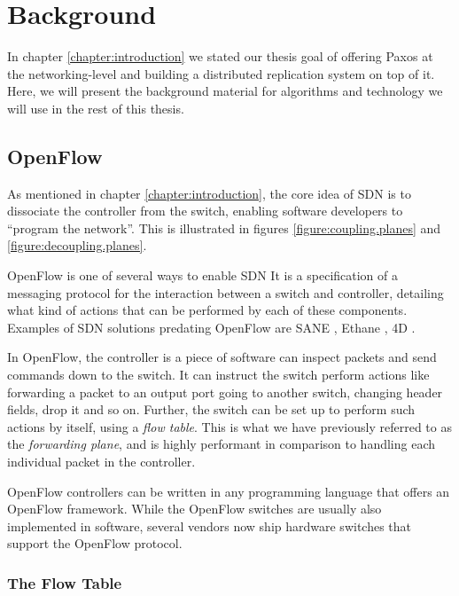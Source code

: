 \chapter{Background}
\label{chapter:background}

In chapter \ref{chapter:introduction} we stated our thesis goal of offering
Paxos at the networking-level and building a distributed replication system
on top of it.
%
Here, we will present the background material for algorithms and technology
we will use in the rest of this thesis.

\section{OpenFlow}
\label{chapter:openflow.background}

As mentioned in chapter \ref{chapter:introduction}, the core idea of
\acs{SDN} is to dissociate the controller from the switch, enabling software
developers to ``program the network''.  This is illustrated in figures
\ref{figure:coupling.planes} and \vref{figure:decoupling.planes}.

OpenFlow \cite{McKeown:2008:OEI:1355734.1355746,openflow-1.0} is one of
several ways to enable \acf{SDN}
%
It is a specification of a messaging protocol for the interaction between
a switch and controller, detailing what kind of actions that can be
performed by each of these components.
%
Examples of \ac{SDN} solutions predating OpenFlow are SANE
\cite{Casado:2006:SPA:1267336.1267346}, Ethane
\cite{Casado:2007:ETC:1282427.1282382}, 4D
\cite{Greenberg:2005:CSA:1096536.1096541}.

In OpenFlow, the controller is a piece of software can inspect packets and
send commands down to the switch.  It can instruct the switch perform actions like
forwarding a packet to an output port going to another switch, changing
header fields, drop it and so on.
%
Further, the switch can be set up to perform such actions by itself,
using a \textit{flow table}.  This is what we have previously referred to as
the \textit{forwarding plane}, and is highly performant in comparison to
handling each individual packet in the controller.

OpenFlow controllers can be written in any programming language that offers
an OpenFlow framework.  While the OpenFlow switches are usually also
implemented in software, several vendors now ship hardware switches that
support the OpenFlow protocol.

\subsection{The Flow Table}
\label{chapter:theory.flow.table}

